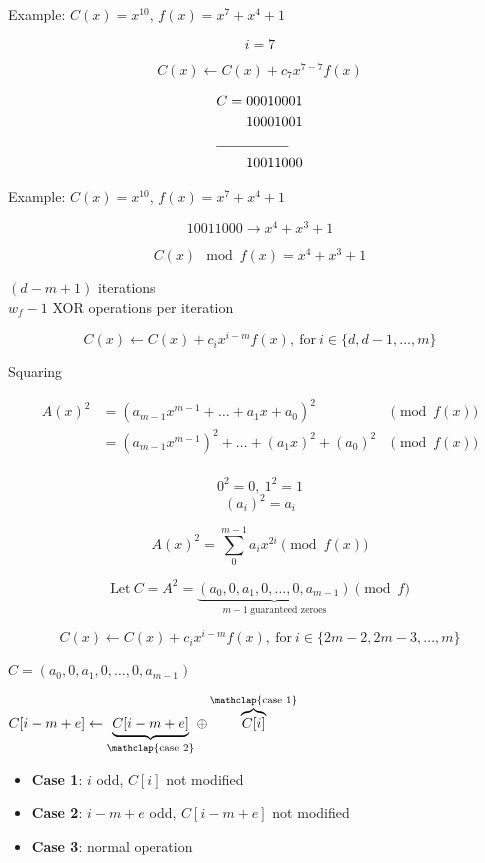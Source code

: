 Example: $C(x) = x^{10}$, $f(x) = x^7 + x^4 + 1$

$$ i = 7 $$

$$ C(x) \leftarrow C(x) + c_{7} x^{7-7} f(x)$$

\begin{align*}
C = 00010001 \\
    10001001 \\
\cline{1-2}
    10011000
\end{align*}


Example: $C(x) = x^{10}$, $f(x) = x^7 + x^4 + 1$

\vspace{2em}

$$ 10011000 \rightarrow x^4 + x^3 + 1 $$

$$ C(x) \mod f(x) =  x^4 + x^3 + 1 $$


$(d-m+1)$ iterations \\
\vspace{1em}
$w_f - 1$ XOR operations per iteration


$$ C(x) \leftarrow C(x) + c_i x^{i-m} f(x),~\text{for}~i \in \{d, d-1, \ldots, m\} $$


Squaring


\begin{align*}
A(x)^2 &= (a_{m-1} x^{m-1} + \ldots + a_1 x + a_0)^2 & \pmod{f(x)} \\
       &= (a_{m-1} x^{m-1})^2 + \ldots + (a_1 x)^2 + (a_0)^2 & \pmod{f(x)} \\
\end{align*}


$$ 0^2 = 0,~1^2 = 1 $$
$$ (a_i)^2 = a_i $$


$$ A(x)^2 = \sum_0^{m-1} a_i x^{2i} \pmod{f(x)} $$


$$ \text{Let}~C = A^2 = \underbrace{(a_0, 0, a_1, 0, \ldots, 0, a_{m-1})}_{m-1 ~\text{guaranteed zeroes}} \pmod{f} $$

$$ C(x) \leftarrow C(x) + c_i x^{i-m} f(x),~\text{for}~i \in \{2m-2, 2m-3, \ldots, m\} $$


$ C = (a_0, 0, a_1, 0, \ldots, 0, a_{m-1}) $

\vspace{1em}

$C[i-m+e] \leftarrow \underbrace{C[i-m+e]}_{\mathclap{\text{case 2}}} \oplus \overbrace{C[i]}^{\mathclap{\text{case 1}}}$

\vspace{1em}

\begin{itemize}
    \item<2-> \textbf{Case 1}: $i$ odd, $C[i]$ not modified
    \item<3-> \textbf{Case 2}: $i-m+e$ odd, $C[i-m+e]$ not modified
    \item<4-> \textbf{Case 3}: normal operation
\end{itemize}


